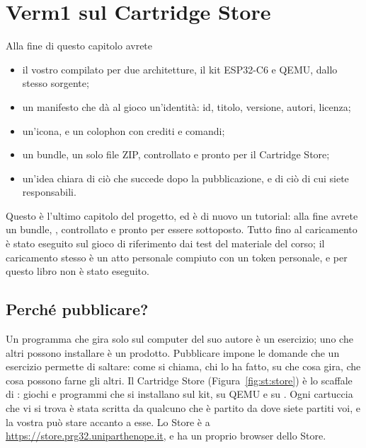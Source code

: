 \chapter{Verm1 sul Cartridge Store}
\label{ch:store}


\begin{chapgoals}
Alla fine di questo capitolo avrete
\begin{itemize}
\item il vostro \vermone compilato per due architetture, il kit ESP32-C6 e QEMU, dallo stesso sorgente;
\item un manifesto che dà al gioco un'identità: id, titolo, versione, autori, licenza;
\item un'icona, e un colophon con crediti e comandi;
\item un bundle, un solo file ZIP, controllato e pronto per il Cartridge Store;
\item un'idea chiara di ciò che succede dopo la pubblicazione, e di ciò di cui siete responsabili.
\end{itemize}
\end{chapgoals}


Questo è l'ultimo capitolo del progetto, ed è di nuovo un tutorial: alla fine
avrete un bundle, , controllato e pronto per essere
sottoposto. Tutto fino al caricamento è stato eseguito sul gioco di riferimento
dai test del materiale del corso; il caricamento stesso è un atto personale
compiuto con un token personale, e per questo libro non è stato eseguito.

\section{Perché pubblicare?}

Un programma che gira solo sul computer del suo autore è un esercizio; uno che
altri possono installare è un prodotto. Pubblicare impone le domande che un
esercizio permette di saltare: come si chiama, chi lo ha fatto, su che cosa
gira, che cosa possono farne gli altri. Il Cartridge Store
(Figura~\ref{fig:st:store}) è lo scaffale di \prg: giochi e programmi che si
installano sul kit, su QEMU e su \prgqt. Ogni cartuccia che vi si trova è stata
scritta da qualcuno che è partito da dove siete partiti voi, e la vostra può
stare accanto a esse. Lo Store è a \url{https://store.prg32.uniparthenope.it},
e \prgqt ha un proprio browser dello Store.

